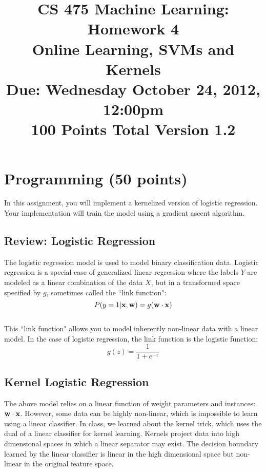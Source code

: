 \documentclass[11pt]{article}
\title{CS 475 Machine Learning: Homework 4\\Online Learning, SVMs and Kernels\\
\Large{Due: Wednesday October 24, 2012, 12:00pm}\\
100 Points Total \hspace{1cm} Version 1.2}
\author{}
\date{}
\newcommand{\vw}{{\bf w}}
\newcommand{\vx}{{\bf x}}
\begin{document}
\large
\maketitle
\thispagestyle{headings}

\vspace{-.5in}

\section{Programming (50 points)}

In this assignment, you will implement a kernelized version of logistic regression. Your implementation will train the model using a gradient ascent algorithm.


\subsection{Review: Logistic Regression}

The logistic regression model is used to model binary classification data. Logistic regression is a special case of generalized linear regression where the labels $Y$ are modeled as a linear combination of the data $X$, but in a transformed space specified by $g$, sometimes called the ``link function":
\begin{equation}
P(y=1 | \vx, \vw) = g(\vw \cdot \vx)
\end{equation}
\\
This ``link function" allows you to model inherently non-linear data with a linear model. In the case of logistic regression, the link function is the logistic function:
\begin{equation}
g(z) = \frac{1}{1 + e^{-z}}
\end{equation}

\subsection{Kernel Logistic Regression}

The above model relies on a linear function of weight parameters and instances: $\vw \cdot \vx$. However, some data can be highly non-linear, which is impossible to learn using a linear classifier. In class, we learned about the kernel trick, which uses the dual of a linear classifier for kernel learning. Kernels project data into high dimensional spaces in which a linear separator may exist. The decision boundary learned by the linear classifier is linear in the high dimensional space but non-linear in the original feature space.
\end{document}
